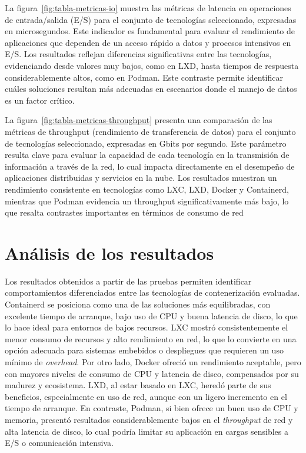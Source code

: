 \noindent
La figura~\ref{fig:tabla-metricas-io} muestra las métricas de latencia en operaciones de entrada/salida (E/S) para el conjunto de tecnologías seleccionado, expresadas en microsegundos. Este indicador es fundamental para evaluar el rendimiento de aplicaciones que dependen de un acceso rápido a datos y procesos intensivos en E/S. Los resultados reflejan diferencias significativas entre las tecnologías, evidenciando desde valores muy bajos, como en LXD, hasta tiempos de respuesta considerablemente altos, como en Podman. Este contraste permite identificar cuáles soluciones resultan más adecuadas en escenarios donde el manejo de datos es un factor crítico.


\noindent
La figura~\ref{fig:tabla-metricas-throughput} presenta una comparación de las métricas de throughput (rendimiento de transferencia de datos) para el conjunto de tecnologías seleccionado, expresadas en Gbits por segundo. Este parámetro resulta clave para evaluar la capacidad de cada tecnología en la transmisión de información a través de la red, lo cual impacta directamente en el desempeño de aplicaciones distribuidas y servicios en la nube. Los resultados muestran un rendimiento consistente en tecnologías como LXC, LXD, Docker y Containerd, mientras que Podman evidencia un throughput significativamente más bajo, lo que resalta contrastes importantes en términos de consumo de red


\section{Análisis de los resultados}
\noindent
Los resultados obtenidos a partir de las pruebas permiten identificar comportamientos diferenciados entre las tecnologías de contenerización evaluadas. Containerd se posiciona como una de las soluciones más equilibradas, con excelente tiempo de arranque, bajo uso de CPU y buena latencia de disco, lo que lo hace ideal para entornos de bajos recursos.
LXC mostró consistentemente el menor consumo de recursos y alto rendimiento en red, lo que lo convierte en una opción adecuada para sistemas embebidos o despliegues que requieren un uso mínimo de \textit{overhead}. 
Por otro lado, Docker ofreció un rendimiento aceptable, pero con mayores niveles de consumo de CPU y latencia de disco, compensados por su madurez y ecosistema. 
LXD, al estar basado en LXC, heredó parte de sus beneficios, especialmente en uso de red, aunque con un ligero incremento en el tiempo de arranque.
En contraste, Podman, si bien ofrece un buen uso de CPU y memoria, presentó resultados considerablemente bajos en el \textit{throughput} de red y alta latencia de disco, lo cual podría limitar su aplicación en cargas sensibles a E/S o comunicación intensiva. \\


